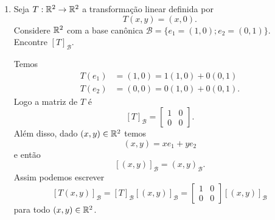 \begin{exemplos}
	\begin{enumerate}
		\item Seja $T : \mathbb{R}^2 \to \mathbb{R}^2$ a transforma\c{c}\~ao linear definida por
		\[
			T(x,y) = (x,0).
		\]
		Considere $\mathbb{R}^2$ com a base can\^onica $\mathcal{B} = \{e_1=(1,0);e_2=(0,1)\}$. Encontre $[T]_\mathcal{B}$.
		\begin{solucao}
			Temos
			\begin{align*}
				T(e_1) &= (1,0) = 1(1,0) + 0(0,1)\\
				T(e_2) &= (0,0) = 0(1,0) + 0(0,1).
			\end{align*}
			Logo a matriz de $T$ \'e
			\[
				[T]_\mathcal{B} = \begin{bmatrix}
					1 & 0\\
					0 & 0
				\end{bmatrix}.
			\]
			Al\'em disso, dado $(x,y) \in \mathbb{R}^2$ temos
			\[
				(x,y) = xe_1 + ye_2
			\]
			e ent\~ao
			\[
				[(x,y)]_\mathcal{B} = (x,y)_\mathcal{B}.
			\]
			Assim podemos escrever
			\[
				[T(x,y)]_\mathcal{B} = [T]_\mathcal{B}[(x,y)]_\mathcal{B} = \begin{bmatrix}
					1 & 0\\
					0 & 0
				\end{bmatrix}[(x,y)]_\mathcal{B}
			\]
			para todo $(x,y) \in \mathbb{R}^2$.
		\end{solucao}


\end{enumerate}
\end{exemplos}
